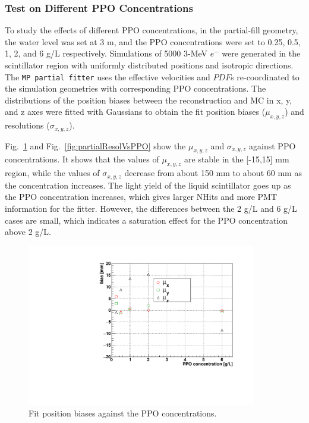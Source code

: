 \subsubsection{Test on Different PPO Concentrations}
To study the effects of different PPO concentrations, in the partial-fill geometry, the water level was set at 3 m, and the PPO concentrations were set to 0.25, 0.5, 1, 2, and 6 g/L respectively. Simulations of 5000 3-MeV $e^-$ were generated in the scintillator region with uniformly distributed positions and isotropic directions. The \texttt{MP partial fitter} uses the effective velocities and $PDF$s re-coordinated to the simulation geometries with corresponding PPO concentrations. The distributions of the position biases between the reconstruction and MC in x, y, and z axes were fitted with Gaussians to obtain the fit position biases ($\mu_{x,y,z}$) and resolutions ($\sigma_{x,y,z}$).

Fig.~\ref{fig:partialBiasVsPPO} and Fig.~\ref{fig:partialResolVsPPO} show the $\mu_{x,y,z}$ and $\sigma_{x,y,z}$ against PPO concentrations. It shows that the values of $\mu_{x,y,z}$ are stable in the [-15,15] mm region, while the values of $\sigma_{x,y,z}$ decrease from about 150 mm to about 60 mm as the concentration increases. The light yield of the liquid scintillator goes up as the PPO concentration increases, which gives larger NHits and more PMT information for the fitter. However, the differences between the 2 g/L and 6 g/L cases are small, which indicates a saturation effect for the PPO concentration above 2 g/L.

\begin{figure}[!htb]
	\centering
	\includegraphics[width=10cm]{partialBiasVsPPO.pdf}
	\caption{Fit position biases against the PPO concentrations.}
	\label{fig:partialBiasVsPPO}
\end{figure}

